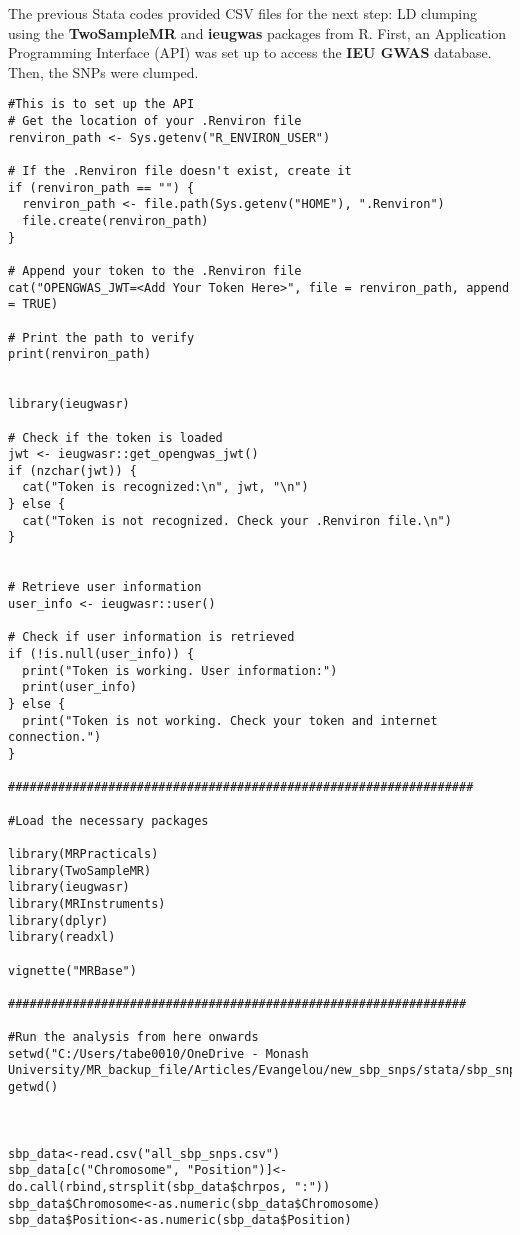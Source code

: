 \documentclass[11pt]{article}
\begin{document}
The previous Stata codes provided CSV files for the next step: LD clumping using the \textbf{TwoSampleMR} and \textbf{ieugwas} packages from R. First, an Application Programming Interface (API) was set up to access the \textbf{IEU GWAS} database. Then, the SNPs were clumped.
\color{violet}
\begin{lstlisting}[style=Rstyle]
#This is to set up the API 
# Get the location of your .Renviron file
renviron_path <- Sys.getenv("R_ENVIRON_USER")

# If the .Renviron file doesn't exist, create it
if (renviron_path == "") {
  renviron_path <- file.path(Sys.getenv("HOME"), ".Renviron")
  file.create(renviron_path)
}

# Append your token to the .Renviron file
cat("OPENGWAS_JWT=<Add Your Token Here>", file = renviron_path, append = TRUE)

# Print the path to verify
print(renviron_path)


library(ieugwasr)

# Check if the token is loaded
jwt <- ieugwasr::get_opengwas_jwt()
if (nzchar(jwt)) {
  cat("Token is recognized:\n", jwt, "\n")
} else {
  cat("Token is not recognized. Check your .Renviron file.\n")
}


# Retrieve user information
user_info <- ieugwasr::user()

# Check if user information is retrieved
if (!is.null(user_info)) {
  print("Token is working. User information:")
  print(user_info)
} else {
  print("Token is not working. Check your token and internet connection.")
}

#################################################################

#Load the necessary packages

library(MRPracticals)
library(TwoSampleMR)
library(ieugwasr)
library(MRInstruments)
library(dplyr)
library(readxl)

vignette("MRBase")

################################################################

#Run the analysis from here onwards 
setwd("C:/Users/tabe0010/OneDrive - Monash University/MR_backup_file/Articles/Evangelou/new_sbp_snps/stata/sbp_snps")
getwd()



sbp_data<-read.csv("all_sbp_snps.csv")
sbp_data[c("Chromosome", "Position")]<-do.call(rbind,strsplit(sbp_data$chrpos, ":"))
sbp_data$Chromosome<-as.numeric(sbp_data$Chromosome)
sbp_data$Position<-as.numeric(sbp_data$Position)



\end{lstlisting}
\end{document}
